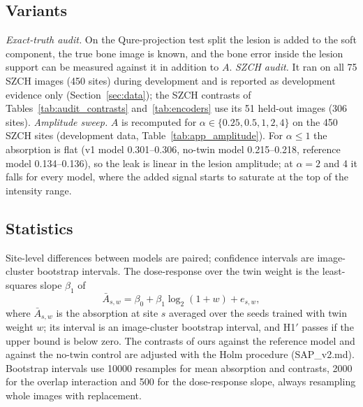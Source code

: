 \subsection{Variants}
\emph{Exact-truth audit.} On the Qure-projection test split the lesion is added to the soft component, the true bone image is known, and the
bone error inside the lesion support can be measured against it in addition to $A$. \emph{SZCH audit.} It ran on all 75 SZCH images (450 sites)
during development and is reported as development evidence only (Section~\ref{sec:data}); the SZCH contrasts of
Tables~\ref{tab:audit_contrasts} and~\ref{tab:encoders} use its 51 held-out images (306 sites). \emph{Amplitude sweep.} $A$ is recomputed for
$\alpha\in\{0.25,0.5,1,2,4\}$ on the 450 SZCH sites (development data, Table~\ref{tab:app_amplitude}). For $\alpha\le1$ the absorption is flat
(v1 model 0.301--0.306, no-twin model 0.215--0.218, reference model 0.134--0.136), so the leak is linear in the lesion amplitude; at $\alpha=2$ and
4 it falls for every model, where the added signal starts to saturate at the top of the intensity range.

\subsection{Statistics}
Site-level differences between models are paired; confidence intervals are image-cluster bootstrap intervals. The dose-response over the
twin weight is the least-squares slope $\beta_1$ of
\begin{equation}
\bar A_{s,w}=\beta_0+\beta_1\log_2(1+w)+e_{s,w},
\label{eq:dose}
\end{equation}
where $\bar A_{s,w}$ is the absorption at site $s$ averaged over the seeds trained with twin weight $w$; its interval is an image-cluster
bootstrap interval, and H1$'$ passes if the upper bound is below zero. The contrasts of ours against the reference model and against the
no-twin control are adjusted with the Holm procedure (SAP\_v2.md). Bootstrap intervals use \num{10000} resamples for mean absorption and contrasts,
\num{2000} for the overlap interaction and 500 for the dose-response slope, always resampling whole images with replacement.
